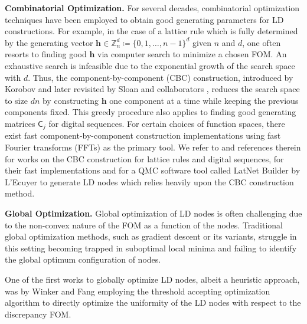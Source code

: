 \documentclass{svproc}
\newcounter{algorithm}%
\begin{document}
\vspace{2mm}
\noindent
\textbf{Combinatorial Optimization.}
For several decades, combinatorial optimization techniques have been employed to obtain good generating parameters for LD constructions. For example, in the case of a lattice rule which is fully determined by the generating vector \(\boldsymbol{h} \in \mathbb{Z}_n^d \coloneqq \{0, 1, \ldots, n-1\}^d\) given $n$ and $d$, 
one often resorts to finding good $\boldsymbol{h}$ via computer search to minimize a chosen FOM. An exhaustive search is infeasible due to the exponential growth of the search space with \(d\). Thus, the component-by-component (CBC) construction, introduced by Korobov \cite{kor63} and later revisited by Sloan and collaborators \cite{Slo02}, reduces the search space to size \(dn\) by constructing \(\boldsymbol{h}\) one component at a time while keeping the previous components fixed. This greedy procedure also applies to finding good generating matrices $\mathsf{C}_j$ for digital sequences.
For certain choices of function spaces, there exist fast component-by-component construction implementations using fast Fourier transforms (FFTs) as the primary tool. We refer to \cite{DicKuo04a,JoeKuo03,KuoJoe02b} and references therein for works on the CBC construction for lattice rules and digital sequences, \cite{NuyCoo06a,NuyCoo06b} for their fast implementations and \cite{LatNet} for a QMC software tool called LatNet Builder by L'Ecuyer to generate LD nodes which relies heavily upon the CBC construction method.



\vspace{2mm}
\noindent
\textbf{Global Optimization.} Global optimization of LD nodes is often challenging due to the non-convex nature of the FOM as a function of the nodes. Traditional global optimization methods, such as gradient descent or its variants, struggle in this setting becoming trapped in suboptimal local minima and failing to identify the global optimum configuration of nodes. 

One of the first works to globally optimize LD nodes, albeit a heuristic approach, was by Winker and Fang \cite{WinFan97b} employing the threshold accepting optimization algorithm to directly optimize the uniformity of the LD nodes with respect to the discrepancy FOM.
\end{document}
